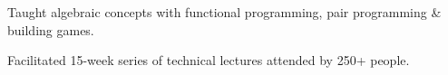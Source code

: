 \documentclass[letterpaper]{deedy-resume} %
\begin{document}
\begin{minipage}[t]{0.66\textwidth}


\begin{tightitemize}
\item Taught algebraic concepts with functional programming, pair programming \& building games.
\end{tightitemize}

\sectionspace %



\begin{tightitemize}
\item Facilitated 15-week series of technical lectures attended by 250+ people.
\end{tightitemize}

\sectionspace %


\end{minipage} %
\end{document}
